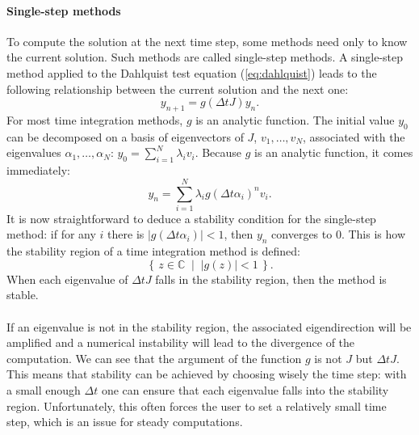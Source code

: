         \paragraph{Single-step methods}
        To compute the solution at the next time step, some methods need only to know the current solution.
        Such methods are called single-step methods.
        A single-step method applied to the Dahlquist test equation (\ref{eq:dahlquist}) leads to the following relationship between the current solution and the next one:
        \begin{equation}\label{eq:single_step}
          y_{n+1} = g\left(\Delta tJ\right)y_n .
        \end{equation}
        For most time integration methods, $g$ is an analytic function.
        The initial value $y_0$ can be decomposed on a basis of eigenvectors of $J$, $v_1, \dots, v_N$, associated with the eigenvalues $\alpha_1, \dots, \alpha_N$: $y_0 = \sum_{i=1}^N \lambda_i v_i$.
        Because $g$ is an analytic function, it comes immediately:
        \begin{equation}
          y_n = \sum_{i=1}^N \lambda_i g\left(\Delta t \alpha_i\right)^n v_i .
        \end{equation}
        It is now straightforward to deduce a stability condition for the single-step method: if for any $i$ there is $\left|g\left(\Delta t\alpha_i\right)\right| < 1$, then $y_n$ converges to 0.
        This is how the stability region of a time integration method is defined:
        \begin{equation}
          \left\{ \, z \in \mathbb{C} \; \mid \; \left| g\left(z\right) \right| < 1 \, \right\} .
        \end{equation}
        When each eigenvalue of $\Delta t J$ falls in the stability region, then the method is stable.

        \paragraph{}
        If an eigenvalue is not in the stability region, the associated eigendirection will be amplified and a numerical instability will lead to the divergence of the computation.
        We can see that the argument of the function $g$ is not $J$ but $\Delta t J$.
        This means that stability can be achieved by choosing wisely the time step: with a small enough $\Delta t$ one can ensure that each eigenvalue falls into the stability region.
        Unfortunately, this often forces the user to set a relatively small time step, which is an issue for steady computations.


